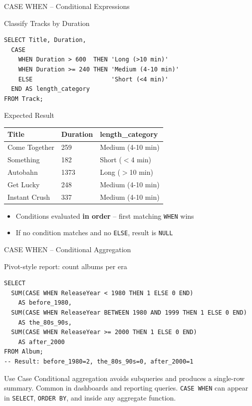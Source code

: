 \begin{frame}[fragile]{CASE WHEN -- Conditional Expressions}
  \begin{block}{Classify Tracks by Duration}
\begin{lstlisting}[style=sqlstyle]
SELECT Title, Duration,
  CASE
    WHEN Duration > 600  THEN 'Long (>10 min)'
    WHEN Duration >= 240 THEN 'Medium (4-10 min)'
    ELSE                      'Short (<4 min)'
  END AS length_category
FROM Track;
\end{lstlisting}
  \end{block}

  \begin{block}{Expected Result}
    \begin{tabular}{@{}lll@{}}
      \toprule
      \textbf{Title} & \textbf{Duration} & \textbf{length\_category} \\
      \midrule
      Come Together & 259  & Medium (4-10 min) \\
      Something     & 182  & Short ($<$4 min) \\
      Autobahn      & 1373 & Long ($>$10 min) \\
      Get Lucky     & 248  & Medium (4-10 min) \\
      Instant Crush & 337  & Medium (4-10 min) \\
      \bottomrule
    \end{tabular}
  \end{block}

  \begin{itemize}
    \item Conditions evaluated \textbf{in order} -- first matching \texttt{WHEN} wins
    \item If no condition matches and no \texttt{ELSE}, result is \texttt{NULL}
  \end{itemize}
\end{frame}

\begin{frame}[fragile]{CASE WHEN -- Conditional Aggregation}
  \begin{block}{Pivot-style report: count albums per era}
\begin{lstlisting}[style=sqlstyle]
SELECT
  SUM(CASE WHEN ReleaseYear < 1980 THEN 1 ELSE 0 END)
    AS before_1980,
  SUM(CASE WHEN ReleaseYear BETWEEN 1980 AND 1999 THEN 1 ELSE 0 END)
    AS the_80s_90s,
  SUM(CASE WHEN ReleaseYear >= 2000 THEN 1 ELSE 0 END)
    AS after_2000
FROM Album;
-- Result: before_1980=2, the_80s_90s=0, after_2000=1
\end{lstlisting}
  \end{block}

  \begin{examples}{Use Case}
    Conditional aggregation avoids subqueries and produces a single-row
    summary. Common in dashboards and reporting queries.
    \texttt{CASE WHEN} can appear in \texttt{SELECT}, \texttt{ORDER BY},
    and inside any aggregate function.
  \end{examples}
\end{frame}
